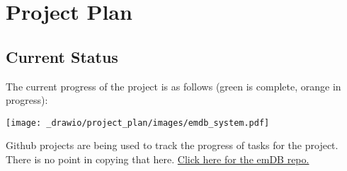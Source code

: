 \chapter{Project Plan}
\section{Current Status}
The current progress of the project is as follows (green is complete, orange in progress):
\begin{center}
    \texttt{[image: \_drawio/project\_plan/images/emdb\_system.pdf]}
\end{center}
Github projects are being used to track the progress of tasks for the project. There is no point in copying that here.
\href{https://github.com/OliverKillane/emDB}{Click here for the emDB repo.}
